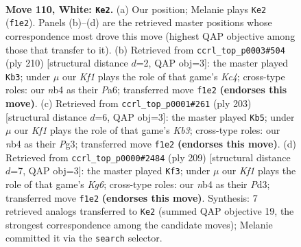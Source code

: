 \documentclass[11pt]{article}
\begin{document}
\clearpage

\begin{figure}[p]\centering
\begin{subfigure}{0.46\textwidth}\centering
\resizebox{\linewidth}{!}{%
\newchessgame
\chessboard[
  setfen={8/8/8/8/1n1B3k/8/5P2/5K1b w - - 65 110},
  showmover=false,
  pgfstyle=straightmove, color=movearrow, markmove={f1-e2}
]}
\caption{}
\end{subfigure}\hfill
\begin{subfigure}{0.46\textwidth}\centering
\resizebox{\linewidth}{!}{%
\newchessgame
\chessboard[
  setfen={8/b3k3/P7/3P4/2K5/5B2/8/8 w - - 23 106},
  showmover=false,
  pgfstyle=straightmove, color=movearrow, markmove={c4-b3}
]}
\caption{}
\end{subfigure}
\\[4pt]
\begin{subfigure}{0.46\textwidth}\centering
\resizebox{\linewidth}{!}{%
\newchessgame
\chessboard[
  setfen={8/8/1k1b4/2p5/8/1K4p1/6B1/8 b - - 75 102},
  showmover=false,
  pgfstyle=straightmove, color=movearrow, markmove={b6-b5}
]}
\caption{}
\end{subfigure}\hfill
\begin{subfigure}{0.46\textwidth}\centering
\resizebox{\linewidth}{!}{%
\newchessgame
\chessboard[
  setfen={8/8/8/8/4b3/3p2k1/6p1/3K2B1 b - - 17 105},
  showmover=false,
  pgfstyle=straightmove, color=movearrow, markmove={g3-f3}
]}
\caption{}
\end{subfigure}
\caption{\textbf{Move 110, White: \texttt{Ke2}.} (a) Our position; Melanie plays \texttt{Ke2} (\texttt{f1e2}). Panels (b)--(d) are the retrieved master positions whose correspondence most drove this move (highest QAP objective among those that transfer to it). (b) Retrieved from \texttt{ccrl\_top\_p0003\#504} (ply 210) [structural distance $d$=2, QAP obj=3]: the master played \texttt{Kb3}; under $\mu$ our \emph{Kf1} plays the role of that game's \emph{Kc4}; cross-type roles: our \emph{n}b4 as their \emph{P}a6; transferred move \texttt{f1e2} \textbf{(endorses this move)}. (c) Retrieved from \texttt{ccrl\_top\_p0001\#261} (ply 203) [structural distance $d$=6, QAP obj=3]: the master played \texttt{Kb5}; under $\mu$ our \emph{Kf1} plays the role of that game's \emph{Kb3}; cross-type roles: our \emph{n}b4 as their \emph{P}g3; transferred move \texttt{f1e2} \textbf{(endorses this move)}. (d) Retrieved from \texttt{ccrl\_top\_p0000\#2484} (ply 209) [structural distance $d$=7, QAP obj=3]: the master played \texttt{Kf3}; under $\mu$ our \emph{Kf1} plays the role of that game's \emph{Kg6}; cross-type roles: our \emph{n}b4 as their \emph{P}d3; transferred move \texttt{f1e2} \textbf{(endorses this move)}. Synthesis: 7 retrieved analogs transferred to \texttt{Ke2} (summed QAP objective 19, the strongest correspondence among the candidate moves); Melanie committed it via the \texttt{search} selector.}
\label{fig:thought-m218}
\end{figure}
\end{document}
